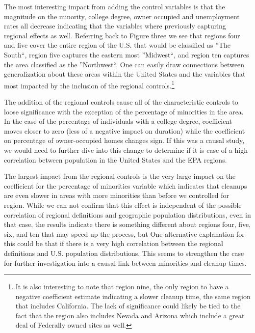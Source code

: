 \documentclass[12pt]{article}
\begin{document}
{The most interesting impact from adding the control variables is that the magnitude on the minority, college degree, owner occupied and unemployment rates all decrease indicating that the variables where previously capturing regional effects as well. Referring back to Figure three we see that regions four and five cover the entire region of the U.S. that would be classified as ''The South``, region five captures the eastern most ''Midwest``, and region ten captures the area classified as the ''Northwest``. One can easily draw connections between generalization about these areas within the United States and the variables that most impacted by the inclusion of the regional controls.\footnote{It is also interesting to note that region nine, the only region to have a negative coefficient estimate indicating a slower cleanup time, the same region that includes California. The lack of significance could likely be tied to the fact that the region also includes Nevada and Arizona which include a great deal of Federally owned sites as well.}

The addition of the regional controls cause all of the characteristic controls to loose significance with the exception of the percentage of minorities in the area. In the case of the percentage of individuals with a college degree, coefficient moves closer to zero (less of a negative impact on duration) while the coefficient on percentage of owner-occupied homes changes sign. If this was a causal study, we would need to further dive into this change to determine if it is case of a high correlation between population in the United States and the EPA regions. 

The largest impact from the regional controls is the very large impact on the coefficient for the percentage of minorities variable which indicates that cleanups are even slower in areas with more minorities than before we controlled for region. While we can not confirm that this effect is independent of the possible correlation of regional definitions and geographic population distributions, even in that case, the results indicate there is something different about regions four, five, six, and ten that may speed up the process, but One alternative explanation for this could be that if there is a very high correlation between the regional definitions and U.S. population distributions, This seems to strengthen the case for further investigation into a causal link between minorities and cleanup times. 

}
\end{document}
